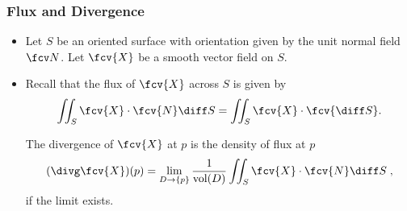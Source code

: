 

\begin{frame}
\frametitle{Flux and Divergence}
\begin{itemize}
\item Let $S$ be an oriented surface with orientation given by the unit normal field $\fcv N$. Let $\fcv{X}$ be a smooth vector field on $S$.
\item Recall that the flux of $\fcv{X}$ across $S$ is given by
\[
\iint_S \fcv{X}\cdot \fcv{N} \diff S = \iint_S \fcv{X} \cdot \fcv{\diff S} .
\]
\begin{definition}
The divergence of $\fcv{X}$ at $p$ is the density of flux at $p$
\[
(\divg \fcv{X})(p) = \lim_{D\to \{p\}} \frac{1}{\text{vol}(D)} \iint_S \fcv{X} \cdot \fcv{N}\diff S \; ,
\]
if the limit exists.
\end{definition}
\end{itemize}
\end{frame}